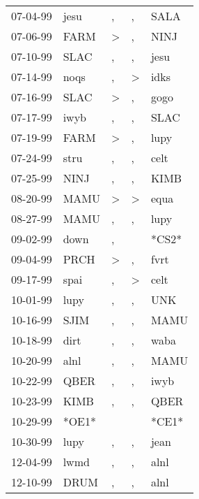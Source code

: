 \begin{supertabular}{lllll}
 07-04-99 &   jesu &                , &                , &   SALA \\
 07-06-99 &   FARM &     \textgreater &                , &   NINJ \\
 07-10-99 &   SLAC &                , &                , &   jesu \\
 07-14-99 &   noqs &                , &     \textgreater &   idks \\
 07-16-99 &   SLAC &     \textgreater &                , &   gogo \\
 07-17-99 &   iwyb &                , &                , &   SLAC \\
 07-19-99 &   FARM &     \textgreater &                , &   lupy \\
 07-24-99 &   stru &                , &                , &   celt \\
 07-25-99 &   NINJ &                , &                , &   KIMB \\
 08-20-99 &   MAMU &     \textgreater &     \textgreater &   equa \\
 08-27-99 &   MAMU &                , &                , &   lupy \\
 09-02-99 &   down &                , &                  &  *CS2* \\
 09-04-99 &   PRCH &     \textgreater &                , &   fvrt \\
 09-17-99 &   spai &                , &     \textgreater &   celt \\
 10-01-99 &   lupy &                , &                , &    UNK \\
 10-16-99 &   SJIM &                , &                , &   MAMU \\
 10-18-99 &   dirt &                , &                , &   waba \\
 10-20-99 &   alnl &                , &                , &   MAMU \\
 10-22-99 &   QBER &                , &                , &   iwyb \\
 10-23-99 &   KIMB &                , &                , &   QBER \\
 10-29-99 &  *OE1* &                  &                  &  *CE1* \\
 10-30-99 &   lupy &                , &                , &   jean \\
 12-04-99 &   lwmd &                , &                , &   alnl \\
 12-10-99 &   DRUM &                , &                , &   alnl \\

\end{supertabular}
